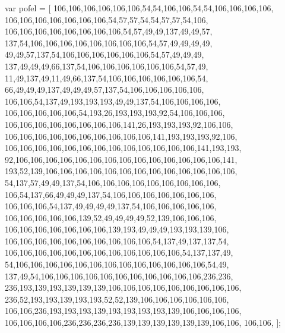 var pofel = [
  106,106,106,106,106,106,54,54,106,106,54,54,106,106,106,106,
  106,106,106,106,106,106,106,54,57,57,54,54,57,57,54,106,
  106,106,106,106,106,106,106,106,54,57,49,49,137,49,49,57,
  137,54,106,106,106,106,106,106,106,106,54,57,49,49,49,49,
  49,49,57,137,54,106,106,106,106,106,106,54,57,49,49,49,
  137,49,49,49,66,137,54,106,106,106,106,106,106,54,57,49,
  11,49,137,49,11,49,66,137,54,106,106,106,106,106,106,54,
  66,49,49,49,137,49,49,49,57,137,54,106,106,106,106,106,
  106,106,54,137,49,193,193,193,49,49,137,54,106,106,106,106,
  106,106,106,106,106,54,193,26,193,193,193,92,54,106,106,106,
  106,106,106,106,106,106,106,106,141,26,193,193,193,92,106,106,
  106,106,106,106,106,106,106,106,106,106,141,193,193,193,92,106,
  106,106,106,106,106,106,106,106,106,106,106,106,106,141,193,193,
  92,106,106,106,106,106,106,106,106,106,106,106,106,106,106,141,
  193,52,139,106,106,106,106,106,106,106,106,106,106,106,106,106,
  54,137,57,49,49,137,54,106,106,106,106,106,106,106,106,106,
  106,54,137,66,49,49,49,137,54,106,106,106,106,106,106,106,
  106,106,106,54,137,49,49,49,49,137,54,106,106,106,106,106,
  106,106,106,106,106,139,52,49,49,49,49,52,139,106,106,106,
  106,106,106,106,106,106,106,139,193,49,49,49,193,193,139,106,
  106,106,106,106,106,106,106,106,106,106,54,137,49,137,137,54,
  106,106,106,106,106,106,106,106,106,106,106,106,54,137,137,49,
  54,106,106,106,106,106,106,106,106,106,106,106,106,106,54,49,
  137,49,54,106,106,106,106,106,106,106,106,106,106,106,236,236,
  236,193,139,193,139,139,139,106,106,106,106,106,106,106,106,106,
  236,52,193,193,139,193,193,52,52,139,106,106,106,106,106,106,
  106,106,236,193,193,193,139,193,193,193,193,139,106,106,106,106,
  106,106,106,106,236,236,236,236,139,139,139,139,139,139,106,106,
  106,106,
];

